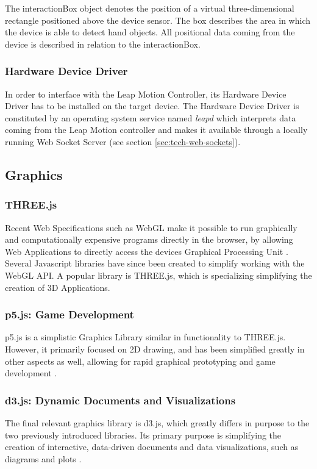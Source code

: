 The interactionBox object denotes the position of a virtual three-dimensional rectangle positioned above the device sensor. The box describes the area in which the device is able to detect hand objects. All positional data coming from the device is described in relation to the interactionBox.

\subsubsection{Hardware Device Driver}
\label{sec:tech:leap-hardware-driver}
In order to interface with the Leap Motion Controller, its Hardware Device Driver has to be installed on the target device. The Hardware Device Driver is constituted by an operating system service named \emph{leapd} which interprets data coming from the Leap Motion controller and makes it available through a locally running Web Socket Server (see section \ref{sec:tech-web-sockets}).
\subsection{Graphics}
\subsubsection{THREE.js}
\label{sec:tech:threejs}
Recent Web Specifications such as WebGL make it possible to run graphically and computationally expensive programs directly in the browser, by allowing Web Applications to directly access the devices Graphical Processing Unit \cite[sec. 1]{WebGl2Spec}. Several Javascript libraries have since been created to simplify working with the WebGL API. A popular library is THREE.js, which is specializing simplifying the creation of 3D Applications.
\subsubsection{p5.js: Game Development}
\label{sec:tech:p5js}
p5.js is a simplistic Graphics Library similar in functionality to THREE.js. However, it primarily focused on 2D drawing, and has been simplified greatly in other aspects as well, allowing for rapid graphical prototyping and game development \cite{P5JS}.
\subsubsection{d3.js: Dynamic Documents and Visualizations}
The final relevant graphics library is d3.js, which greatly differs in purpose to the two previously introduced libraries. Its primary purpose is simplifying the creation of interactive, data-driven documents and data visualizations, such as diagrams and plots \cite[preface]{zhu2013data}. 
